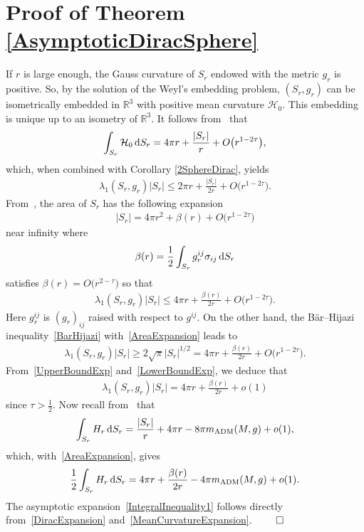 \documentclass[10pt,a4paper]{amsart}
\numberwithin{equation}{section}
\begin{document}
\section{Proof of Theorem \ref{AsymptoticDiracSphere}}\label{LargeSphereLimit}

If $r$ is large enough, the Gauss curvature of $S_r$ endowed with the metric $g_r$ is positive. So, by the solution of the Weyl's embedding problem, $(S_r,g_r)$ can be isometrically embedded in $\mathbb{R}^3$ with positive mean curvature $\mathcal{H}_0$. This embedding is unique up to an isometry of $\mathbb{R}^3$. It follows from~\cite[Lemma~2.4]{FanShiTam} that
\begin{gather*}%
\int_{S_r}\mathcal{H}_0\,{\rm d}S_r=4\pi r+\frac{|S_r|}{r}+O\big(r^{1-2\tau}\big),
\end{gather*}
which, when combined with Corollary \ref{2SphereDirac}, yields
\begin{gather*}
\lambda_1(S_r,g_r)|S_r|\leq 2\pi r+\frac{|S_r|}{2r}+O\big(r^{1-2\tau}\big).
\end{gather*}
From~\cite[Lemma 2.1]{FanShiTam}, the area of $S_r$ has the following expansion
\begin{gather}\label{AreaExpansion}
|S_r|=4\pi r^2+\beta(r)+O\big(r^{1-2\tau}\big)
\end{gather}
near infinity where
\begin{gather*}
\beta(r)=\frac{1}{2}\int_{S_r}g_r^{ij}\sigma_{ij}\,{\rm d}S_r
\end{gather*}
satisfies $\beta(r)=O\big(r^{2-\tau}\big)$ so that
\begin{gather}\label{UpperBoundExp}
\lambda_1(S_r,g_r)|S_r|\leq 4\pi r+\frac{\beta(r)}{2r}+O\big(r^{1-2\tau}\big).
\end{gather}
Here $g_r^{ij}$ is $(g_r)_{ij}$ raised with respect to $g^{ij}$. On the other hand, the B\"ar--Hijazi inequality~\eqref{BarHijazi} with~\eqref{AreaExpansion} leads to
\begin{gather}\label{LowerBoundExp}
\lambda_1(S_r,g_r)|S_r|\geq 2\sqrt{\pi}|S_r|^{1/2}=4\pi r+\frac{\beta(r)}{2r}+O\big(r^{1-2\tau}\big).
\end{gather}
From~\eqref{UpperBoundExp} and~\eqref{LowerBoundExp}, we deduce that
\begin{gather}\label{DiracExpansion}
\lambda_1(S_r,g_r)|S_r|=4\pi r+\frac{\beta(r)}{2r}+o(1)
\end{gather}
since $\tau>\frac{1}{2}$. Now recall from~\cite[Lemma 2.2]{FanShiTam} that
\begin{gather*}
\int_{S_r}H_r\,{\rm d}S_r=\frac{|S_r|}{r}+4\pi r-8\pi m_{\rm ADM}(M,g)+o(1),
\end{gather*}
which, with~\eqref{AreaExpansion}, gives
\begin{gather}\label{MeanCurvatureExpansion}
\frac{1}{2}\int_{S_r}H_r\,{\rm d}S_r= 4\pi r+\frac{\beta(r)}{2r}-4\pi m_{\rm ADM}(M,g)+o(1).
\end{gather}
The asymptotic expansion~\eqref{IntegralInequality1} follows directly from~\eqref{DiracExpansion} and~\eqref{MeanCurvatureExpansion}.
\hfill$\qed$
\end{document}

